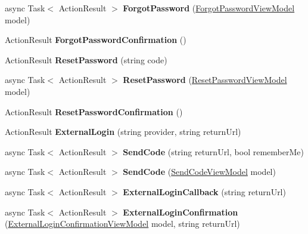 \begin{DoxyCompactItemize}
\item 
async Task$<$ Action\+Result $>$ {\bfseries Forgot\+Password} (\hyperlink{a00079}{Forgot\+Password\+View\+Model} model)\hypertarget{a00007_a00ae9dd6283bd55904b623116df807d5}{}\label{a00007_a00ae9dd6283bd55904b623116df807d5}

\item 
Action\+Result {\bfseries Forgot\+Password\+Confirmation} ()\hypertarget{a00007_ae147dc905e1ffa42024972baea8eafe7}{}\label{a00007_ae147dc905e1ffa42024972baea8eafe7}

\item 
Action\+Result {\bfseries Reset\+Password} (string code)\hypertarget{a00007_a2e497c6b396e8aaaf8ae980c8af75147}{}\label{a00007_a2e497c6b396e8aaaf8ae980c8af75147}

\item 
async Task$<$ Action\+Result $>$ {\bfseries Reset\+Password} (\hyperlink{a00173}{Reset\+Password\+View\+Model} model)\hypertarget{a00007_aed92611d92bc62645f198738b2559576}{}\label{a00007_aed92611d92bc62645f198738b2559576}

\item 
Action\+Result {\bfseries Reset\+Password\+Confirmation} ()\hypertarget{a00007_a6ef5f5129df81ea7eedf82cdece7d2d2}{}\label{a00007_a6ef5f5129df81ea7eedf82cdece7d2d2}

\item 
Action\+Result {\bfseries External\+Login} (string provider, string return\+Url)\hypertarget{a00007_a7635a2faadc86831237f200498f7a419}{}\label{a00007_a7635a2faadc86831237f200498f7a419}

\item 
async Task$<$ Action\+Result $>$ {\bfseries Send\+Code} (string return\+Url, bool remember\+Me)\hypertarget{a00007_a1a8d7f86ccd6078b9249087d87a6da9a}{}\label{a00007_a1a8d7f86ccd6078b9249087d87a6da9a}

\item 
async Task$<$ Action\+Result $>$ {\bfseries Send\+Code} (\hyperlink{a00177}{Send\+Code\+View\+Model} model)\hypertarget{a00007_a99dab3cb95c5b5475322f578702ebaa5}{}\label{a00007_a99dab3cb95c5b5475322f578702ebaa5}

\item 
async Task$<$ Action\+Result $>$ {\bfseries External\+Login\+Callback} (string return\+Url)\hypertarget{a00007_a5760207883e656b3dd51d09e1883fe1a}{}\label{a00007_a5760207883e656b3dd51d09e1883fe1a}

\item 
async Task$<$ Action\+Result $>$ {\bfseries External\+Login\+Confirmation} (\hyperlink{a00075}{External\+Login\+Confirmation\+View\+Model} model, string return\+Url)\hypertarget{a00007_acdf7512b03daeacb9ab9b8eaf3399ed0}{}\label{a00007_acdf7512b03daeacb9ab9b8eaf3399ed0}


\end{DoxyCompactItemize}
